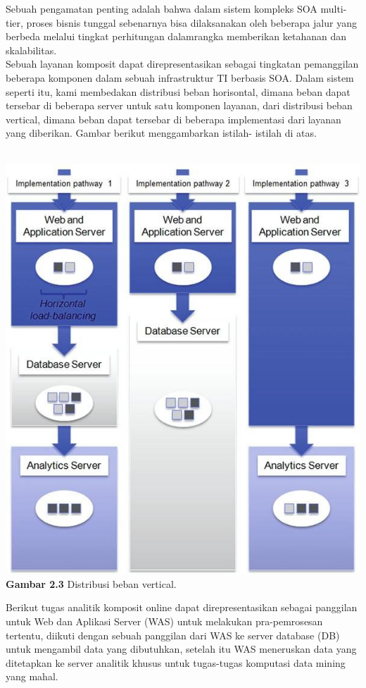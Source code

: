 \tab Sebuah pengamatan penting adalah bahwa dalam sistem kompleks SOA multi-tier, proses bisnis tunggal sebenarnya bisa dilaksanakan oleh beberapa jalur yang berbeda melalui tingkat perhitungan dalamrangka memberikan ketahanan dan skalabilitas.\\
Sebuah layanan komposit dapat direpresentasikan sebagai tingkatan pemanggilan beberapa komponen dalam sebuah infrastruktur TI berbasis SOA. Dalam sistem seperti itu, kami membedakan distribusi beban horisontal, dimana beban dapat tersebar di  beberapa  server untuk satu komponen layanan, dari distribusi beban vertical, dimana beban dapat tersebar di beberapa implementasi dari layanan yang diberikan. Gambar berikut menggambarkan istilah- istilah di atas.\\\\
\begin{center}
\includegraphics[scale=1]{gambar23.jpg} \\
\textbf{Gambar  2.3} Distribusi beban vertical.
\end{center}
Berikut tugas analitik komposit online dapat direpresentasikan sebagai panggilan  untuk Web  dan Aplikasi Server (WAS) untuk melakukan pra-pemrosesan tertentu, diikuti dengan sebuah panggilan dari WAS ke server database (DB) untuk mengambil  data yang dibutuhkan,  setelah itu WAS meneruskan data yang ditetapkan ke server analitik khusus untuk tugas-tugas komputasi data mining yang mahal.\\
